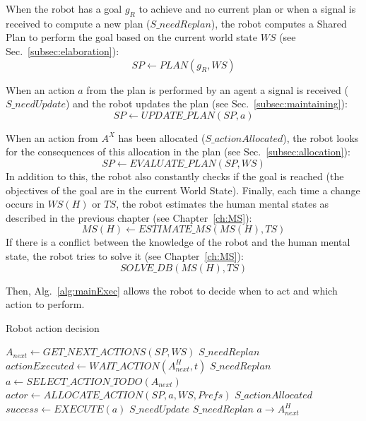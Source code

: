 \documentclass[english,a4paper,11pt,twoside]{StyleThese}
\begin{document}
When the robot has a goal $g_R$ to achieve and no current plan or when a signal is received to compute a new plan ($S\_needReplan$), the robot computes a Shared Plan to perform the goal based on the current world state $WS$ (see Sec.~\ref{subsec:elaboration}):
$$SP \leftarrow PLAN(g_R, WS)$$

When an action $a$ from the plan is performed by an agent a signal is received ($S\_needUpdate$) and the robot updates the plan (see Sec.~\ref{subsec:maintaining}):
$$SP \leftarrow UPDATE\_PLAN(SP, a)$$

When an action from $A^X$ has been allocated ($S\_actionAllocated$), the robot looks for the consequences of this allocation in the plan (see Sec.~\ref{subsec:allocation}):
$$SP \leftarrow EVALUATE\_ PLAN(SP, WS)$$
In addition to this, the robot also constantly checks if the goal is reached (the objectives of the goal are in the current World State).
Finally, each time a change occurs in $WS(H)$ or $TS$, the robot estimates the human mental states as described in the previous chapter (see Chapter~\ref{ch:MS}):
$$MS(H) \leftarrow ESTIMATE\_MS(MS(H), TS)$$
If there is a conflict between the knowledge of the robot and the human mental state, the robot tries to solve it (see Chapter~\ref{ch:MS}): 
$$SOLVE\_DB(MS(H), TS)$$

Then, Alg.~\ref{alg:mainExec} allows the robot to decide when to act and which action to perform. 


\begin{algorithm}
\caption{Robot action decision}
\label{alg:mainExec}
\begin{algorithmic}
\STATE $A_{next} \leftarrow GET\_NEXT\_ACTIONS(SP, WS)$
\STATE $S\_needReplan$
\STATE $actionExecuted \leftarrow WAIT\_ACTION(A^H_{next}, t)$
\STATE $S\_needReplan$
\ENDIF 
\ELSE
\STATE $a \leftarrow SELECT\_ACTION\_TODO(A_{next})$
\STATE $actor \leftarrow ALLOCATE\_ACTION(SP, a, WS, Prefs)$
\STATE $S\_actionAllocated$
\ENDIF
{}
\STATE $success \leftarrow EXECUTE(a)$
\STATE $S\_needUpdate$
\ELSE 
\STATE $S\_needReplan$
\ENDIF
{}
\STATE $a \rightarrow A^H_{next}$
\ENDIF
\ENDIF
\ENDWHILE
\end{algorithmic}
\end{algorithm} 
\end{document}
